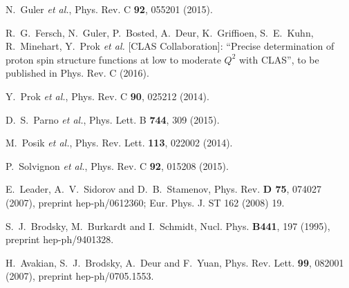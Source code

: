 \documentclass[a4paper,12pt]{report}
\begin{document}
\begin{thebibliography}{99}
N.~Guler {\it et al.}, %
Phys. Rev. C {\bf 92}, 055201 (2015).

R.~G.~Fersch, N.~Guler, P.~Bosted, A.~Deur, K.~Griffioen, S.~E.~Kuhn,
R.~Minehart, Y.~Prok {\it et al.} [CLAS Collaboration]:
``Precise determination of proton spin structure functions at
low to moderate $Q^2$ with CLAS'',
to be published in Phys. Rev. C (2016).

Y.~Prok {\it et al.},
Phys. Rev. C {\bf 90}, 025212 (2014).

D.~S.~Parno {\it et al.},
Phys. Lett. B {\bf 744}, 309 (2015).

M.~Posik {\it et al.},
Phys. Rev. Lett. {\bf 113}, 022002 (2014).

P.~Solvignon {\it et al.},
Phys. Rev. C {\bf 92}, 015208 (2015).

  E.~Leader, A.~V.~Sidorov and D.~B.~Stamenov,
Phys. Rev. {\bf D 75}, 074027 (2007), 
preprint hep-ph/0612360; Eur. Phys. J. ST 162 (2008) 19.

  S.~J.~Brodsky, M.~Burkardt and I.~Schmidt,
  Nucl. Phys. {\bf B441}, 197 (1995), 
  preprint hep-ph/9401328.

  H.~Avakian, S.~J.~Brodsky, A.~Deur and F.~Yuan,
  Phys. Rev. Lett. {\bf 99}, 082001 (2007), 
  preprint hep-ph/0705.1553.


\end{thebibliography}
\end{document}
